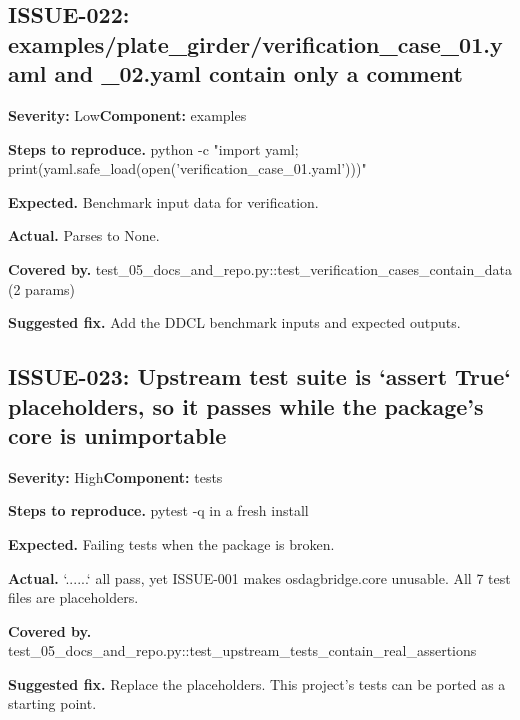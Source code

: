 \subsection*{ISSUE-022: examples/\allowbreak{}plate\_\allowbreak{}girder/\allowbreak{}verification\_\allowbreak{}case\_\allowbreak{}01.\allowbreak{}yaml and \_\allowbreak{}02.\allowbreak{}yaml contain only a comment}
\textbf{Severity:} Low\quad \textbf{Component:} examples\par
\textbf{Steps to reproduce.} python -c "import yaml; print(yaml.\allowbreak{}safe\_\allowbreak{}load(open('verification\_\allowbreak{}case\_\allowbreak{}01.\allowbreak{}yaml')))"\par
\textbf{Expected.} Benchmark input data for verification.\allowbreak{}\par
\textbf{Actual.} Parses to None.\allowbreak{}\par
\textbf{Covered by.} test\_\allowbreak{}05\_\allowbreak{}docs\_\allowbreak{}and\_\allowbreak{}repo.\allowbreak{}py::\allowbreak{}test\_\allowbreak{}verification\_\allowbreak{}cases\_\allowbreak{}contain\_\allowbreak{}data (2 params)\par
\textbf{Suggested fix.} Add the DDCL benchmark inputs and expected outputs.\allowbreak{}

\subsection*{ISSUE-023: Upstream test suite is `assert True` placeholders, so it passes while the package's core is unimportable}
\textbf{Severity:} High\quad \textbf{Component:} tests\par
\textbf{Steps to reproduce.} pytest -q in a fresh install\par
\textbf{Expected.} Failing tests when the package is broken.\allowbreak{}\par
\textbf{Actual.} `.\allowbreak{}.\allowbreak{}.\allowbreak{}.\allowbreak{}.\allowbreak{}.\allowbreak{}` all pass, yet ISSUE-001 makes osdagbridge.\allowbreak{}core unusable.\allowbreak{} All 7 test files are placeholders.\allowbreak{}\par
\textbf{Covered by.} test\_\allowbreak{}05\_\allowbreak{}docs\_\allowbreak{}and\_\allowbreak{}repo.\allowbreak{}py::\allowbreak{}test\_\allowbreak{}upstream\_\allowbreak{}tests\_\allowbreak{}contain\_\allowbreak{}real\_\allowbreak{}assertions\par
\textbf{Suggested fix.} Replace the placeholders.\allowbreak{} This project's tests can be ported as a starting point.\allowbreak{}

